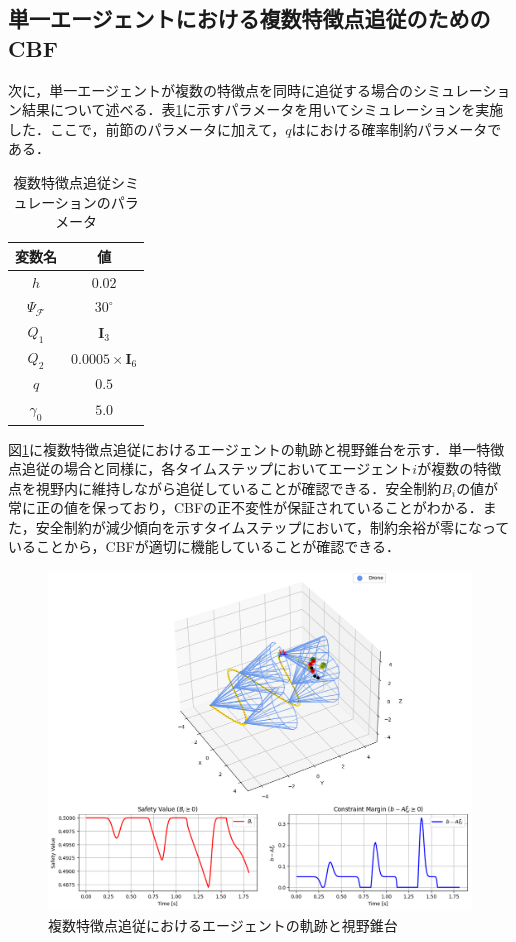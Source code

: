 \subsection{単一エージェントにおける複数特徴点追従のためのCBF}

次に，単一エージェントが複数の特徴点を同時に追従する場合のシミュレーション結果について述べる．表\ref{tab:multi_point_params}に示すパラメータを用いてシミュレーションを実施した．ここで，前節のパラメータに加えて，$q$はにおける確率制約パラメータである．

\begin{table}[htbp]
\centering
\caption{複数特徴点追従シミュレーションのパラメータ}
\label{tab:multi_point_params}
\begin{tabular}{cc}
\hline
変数名 & 値 \\
\hline
$h$ & $0.02$ \\
$\Psi_{\mathcal{F}}$ & $30^{\circ}$ \\
$Q_1$ & $\mathbf{I}_3$ \\
$Q_2$ & $0.0005\times\mathbf{I}_6$ \\
$q$ & $0.5$ \\
$\gamma_0$ & $5.0$ \\
\hline
\end{tabular}
\end{table}

図\ref{fig:multi_trajectory}に複数特徴点追従におけるエージェントの軌跡と視野錐台を示す．単一特徴点追従の場合と同様に，各タイムステップにおいてエージェント$i$が複数の特徴点を視野内に維持しながら追従していることが確認できる．安全制約$B_{i}$の値が常に正の値を保っており，CBFの正不変性が保証されていることがわかる．また，安全制約が減少傾向を示すタイムステップにおいて，制約余裕が零になっていることから，CBFが適切に機能していることが確認できる．

\begin{figure}[htbp]
\centering
\includegraphics[width=0.6\linewidth]{fig/pcl_single.png}
\caption{複数特徴点追従におけるエージェントの軌跡と視野錐台}
\label{fig:multi_trajectory}
\end{figure}

